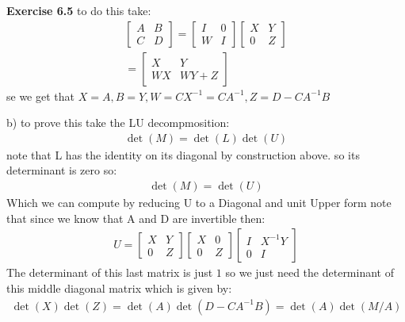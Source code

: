 \documentclass[12pt]{article}
\newenvironment{exercise}[1]{\vspace{.1in}\noindent\textbf{Exercise #1 \hspace{.05em}}}{}
\theoremstyle{definition}
\theoremstyle{remark}
\begin{document}
\begin{exercise}{6.5}
	to do this take:
	\begin{align}
		\begin{bmatrix}
			A & B \\
			C & D
		\end{bmatrix}=%
		\begin{bmatrix}
			I & 0 \\
			W & I
		\end{bmatrix}%
		\begin{bmatrix}
			X & Y \\
			0 & Z
		\end{bmatrix} \\
		=   %
		\begin{bmatrix}
			X  & Y    \\
			WX & WY+Z
		\end{bmatrix}
	\end{align}
	se we get that $X=A,B=Y,W=CX^{-1}=CA^{-1},Z=D-CA^{-1}B$

	b) to prove this take the LU decompmosition:
	\begin{align}
		\det(M)=\det(L)\det(U)
	\end{align}
	note that L has the identity on its diagonal by construction above. so its determinant is zero so:
	\begin{align}
		\det(M)=\det(U)
	\end{align}
	Which we can compute by reducing U to a Diagonal and unit Upper form note that since we know that A and D are invertible then:
	\begin{align}
		U= %
		\begin{bmatrix}
			X & Y \\
			0 & Z
		\end{bmatrix} %
		\begin{bmatrix}
			X & 0 \\
			0 & Z
		\end{bmatrix}%
		\begin{bmatrix}
			I & X^{-1}Y \\
			0 & I
		\end{bmatrix}
	\end{align}
	The determinant of this last matrix is just $1$ so we just need the determinant of this middle diagonal matrix which is given by:
	\begin{align}
		\det(X)\det(Z)=\det(A)\det(D-CA^{-1}B)=\det(A)\det(M/A)
	\end{align}


\end{exercise}
\end{document}
